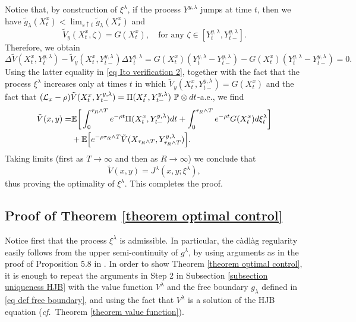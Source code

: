 \documentclass[11pt]{amsart}
\theoremstyle{plain}
\def \dd{{\rm d}}
\numberwithin{equation}{section}
\begin{document}
Notice that, by construction of $\xi^\lambda$, if the process $Y^{y,\lambda}$ jumps at time $t$, then we have $\tilde g_\lambda (X^x_t) < \lim_{s \uparrow t} \tilde g _\lambda (X^x_{s})$ and 
$$
\tilde V_y(X^x_t, \zeta) = G(X^x_t), \quad \text{for any $\zeta \in [Y^{y,\lambda}_t, Y^{y,\lambda}_{t-}]$}.
$$
Therefore, we obtain
$$
\Delta \tilde V (X^x_t,Y^{y,\lambda}_{t}) -\tilde V _y (X^x_t,Y^{y,\lambda}_{t-})\Delta Y^{y,\lambda}_t  = G(X^x_t) (Y^{y,\lambda}_{t}-Y^{y,\lambda}_{t-})  - G(X^x_t) ( Y^{y,\lambda}_t - Y^{y,\lambda}_{t-}) = 0. 
$$
Using the latter equality in \eqref{eq Ito verification 2}, together with the fact that the process $\xi^\lambda$ increases only at times $t$ in which $\tilde V _y (X^x_t,Y^{y,\lambda}_{t-})= G(X^x_t)$ and the fact that $(\mathcal L _x - \rho)\tilde V (X^x_t,Y^{y,\lambda}_{t-}) = \Pi (X^x_t,Y^{y,\lambda}_{t-}) \ \mathbb P \otimes \dd t$-a.e., we find
\begin{equation*}
\begin{aligned}
 \tilde V (x,y)  
    =& \mathbb{E}\bigg[\int_0^{\tau_R\wedge T} e^{-\rho t} \Pi(X^x_t,Y^{y,\lambda}_{t-})    \dd t  
     + \int_0^{\tau_R\wedge T} e^{-\rho t} G (X^x_t) \dd \xi_t^\lambda \bigg] \\ 
     &  + \mathbb{E}\Big[e^{-\rho \tau_R \wedge T } \tilde V(X_{\tau_R\wedge T},Y^{y,\lambda}_{\tau_R\wedge T})\Big].
\end{aligned}
\end{equation*}
Taking limits (first as $T \to \infty$ and then as $R\to \infty$) we conclude that
$$
\tilde V(x,y) = J^\lambda (x,y;\xi^\lambda),
$$
thus proving the optimality of $\xi^\lambda$.
This completes the proof.

\subsection{Proof of Theorem \ref{theorem optimal control}}\label{subsection proof optimal control}
Notice first that the process $\xi^\lambda$ is admissible. In particular, the càdlàg regularity easily follows from the upper semi-continuity of $g^\lambda$, by using arguments as in the proof of Proposition 5.8 in \cite{deangelis.ferrari.federico.2017optimal}. 
In order to show Theorem \ref{theorem optimal control}, it is enough to repeat the arguments in Step 2 in Subsection \ref{subsection uniqueness HJB} with the value function $V^\lambda$ and the free boundary $g_\lambda$ defined in \eqref{eq def free boundary}, and using the fact that $V^\lambda$ is a solution of the HJB equation ({\it cf.}\ Theorem \ref{theorem value function}).
\end{document}
